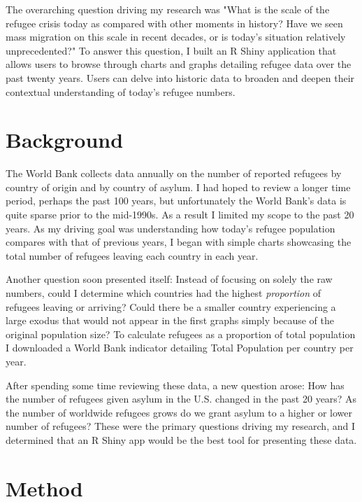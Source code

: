 \documentclass{article}
\begin{document}
\noindent The overarching question driving my research was "What is the scale of the refugee crisis today as compared with other moments in history? Have we seen mass migration on this scale in recent decades, or is today's situation relatively unprecedented?" To answer this question, I built an R Shiny application that allows users to browse through charts and graphs detailing refugee data over the past twenty years. Users can delve into historic data to broaden and deepen their contextual understanding of today’s refugee numbers.  

\section{Background}

The World Bank collects data annually on the number of reported refugees by country of origin and by country of asylum. I had hoped to review a longer time period, perhaps the past 100 years, but unfortunately the World Bank's data is quite sparse prior to the mid-1990s. As a result I limited my scope to the past 20 years. As my driving goal was understanding how today's refugee population compares with that of previous years, I began with simple charts showcasing the total number of refugees leaving each country in each year.\vspace{2mm}

\noindent
Another question soon presented itself: Instead of focusing on solely the raw numbers, could I determine which countries had the highest \emph{proportion} of refugees leaving or arriving? Could there be a smaller country experiencing a large exodus that would not appear in the first graphs simply because of the original population size? To calculate refugees as a proportion of total population I downloaded a World Bank indicator detailing Total Population per country per year.\vspace{2mm}

\noindent
After spending some time reviewing these data, a new question arose: How has the number of refugees given asylum in the U.S. changed in the past 20 years? As the number of worldwide refugees grows do we grant asylum to a higher or lower number of refugees?
These were the primary questions driving my research, and I determined that an R Shiny app would be the best tool for presenting these data.
\section{Method}
\end{document}
